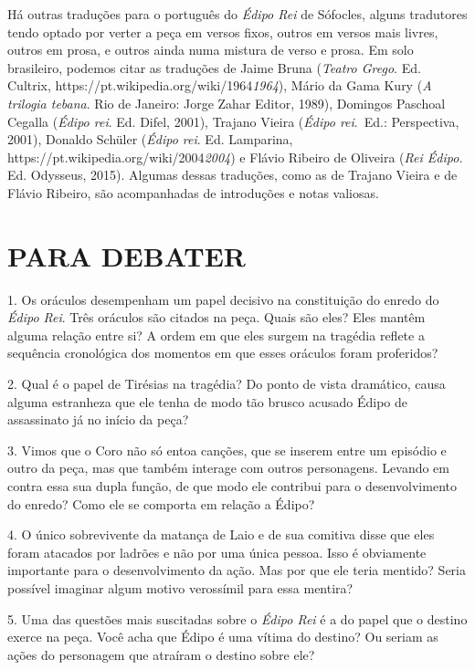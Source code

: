 Há outras traduções para o português do \emph{Édipo Rei} de Sófocles,
alguns tradutores tendo optado por verter a peça em versos fixos, outros
em versos mais livres, outros em prosa, e outros ainda numa mistura de
verso e prosa. Em solo brasileiro, podemos citar as traduções de Jaime
Bruna (\emph{Teatro Grego}. Ed.
Cultrix, {https://pt.wikipedia.org/wiki/1964}{\emph{1964}}), Mário
da Gama Kury (\emph{A trilogia tebana}. Rio de Janeiro: Jorge Zahar
Editor, 1989), Domingos Paschoal Cegalla (\emph{Édipo rei}. Ed. Difel,
2001), Trajano Vieira (\emph{Édipo rei}.~Ed.: Perspectiva, 2001),
Donaldo Schüler (\emph{Édipo rei}. Ed.
Lamparina, {https://pt.wikipedia.org/wiki/2004}{\emph{2004}}) e
Flávio Ribeiro de Oliveira (\emph{Rei Édipo.} Ed. Odysseus, 2015).
Algumas dessas traduções, como as de Trajano Vieira e de Flávio Ribeiro,
são acompanhadas de introduções e notas valiosas.

\chapter{PARA DEBATER}

1. Os oráculos desempenham um papel decisivo na constituição do enredo
do \emph{Édipo Rei}. Três oráculos são citados na peça. Quais são eles?
Eles mantêm alguma relação entre si? A ordem em que eles surgem na
tragédia reflete a sequência cronológica dos momentos em que esses
oráculos foram proferidos?

2. Qual é o papel de Tirésias na tragédia? Do ponto de vista dramático,
causa alguma estranheza que ele tenha de modo tão brusco acusado Édipo
de assassinato já no início da peça?

3. Vimos que o Coro não só entoa canções, que se inserem entre um
episódio e outro da peça, mas que também interage com outros
personagens. Levando em contra essa sua dupla função, de que modo ele
contribui para o desenvolvimento do enredo? Como ele se comporta em
relação a Édipo?

4. O único sobrevivente da matança de Laio e de sua comitiva disse que
eles foram atacados por ladrões e não por uma única pessoa. Isso é
obviamente importante para o desenvolvimento da ação. Mas por que ele
teria mentido? Seria possível imaginar algum motivo verossímil para essa
mentira?

5. Uma das questões mais suscitadas sobre o \emph{Édipo Rei} é a do
papel que o destino exerce na peça. Você acha que Édipo é uma vítima do
destino? Ou seriam as ações do personagem que atraíram o destino sobre
ele?


